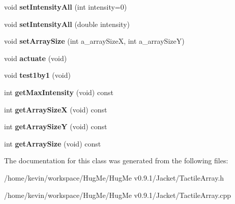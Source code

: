 \begin{DoxyCompactItemize}
\item 
\hypertarget{classTactileArray_abbca9d69c0c6be1816214ebb75ecd16c}{
void {\bfseries setIntensityAll} (int intensity=0)}
\label{classTactileArray_abbca9d69c0c6be1816214ebb75ecd16c}

\item 
\hypertarget{classTactileArray_ad3edd3dc58c199e73a5095fe9ccb6c5e}{
void {\bfseries setIntensityAll} (double intensity)}
\label{classTactileArray_ad3edd3dc58c199e73a5095fe9ccb6c5e}

\item 
\hypertarget{classTactileArray_adc94914edaa38a6c261f2b8a42f88bbb}{
void {\bfseries setArraySize} (int a\_\-arraySizeX, int a\_\-arraySizeY)}
\label{classTactileArray_adc94914edaa38a6c261f2b8a42f88bbb}

\item 
\hypertarget{classTactileArray_a2d2e28e36c7d0f166e06d5061ba85196}{
void {\bfseries actuate} (void)}
\label{classTactileArray_a2d2e28e36c7d0f166e06d5061ba85196}

\item 
\hypertarget{classTactileArray_a40a5564388ad4ee3fabf8b9866538b48}{
void {\bfseries test1by1} (void)}
\label{classTactileArray_a40a5564388ad4ee3fabf8b9866538b48}

\item 
\hypertarget{classTactileArray_a5bb334c3d9bca1949141f7ae4a6637ba}{
int {\bfseries getMaxIntensity} (void) const }
\label{classTactileArray_a5bb334c3d9bca1949141f7ae4a6637ba}

\item 
\hypertarget{classTactileArray_a7a573669d558b1a22bf3e943795af119}{
int {\bfseries getArraySizeX} (void) const }
\label{classTactileArray_a7a573669d558b1a22bf3e943795af119}

\item 
\hypertarget{classTactileArray_a7dbe69bda14b3c208d96f4e5e1fa19be}{
int {\bfseries getArraySizeY} (void) const }
\label{classTactileArray_a7dbe69bda14b3c208d96f4e5e1fa19be}

\item 
\hypertarget{classTactileArray_afffd3159074b989045c47807b133cbec}{
int {\bfseries getArraySize} (void) const }
\label{classTactileArray_afffd3159074b989045c47807b133cbec}

\end{DoxyCompactItemize}


The documentation for this class was generated from the following files:\begin{DoxyCompactItemize}
\item 
/home/kevin/workspace/HugMe/HugMe v0.9.1/Jacket/TactileArray.h\item 
/home/kevin/workspace/HugMe/HugMe v0.9.1/Jacket/TactileArray.cpp\end{DoxyCompactItemize}
